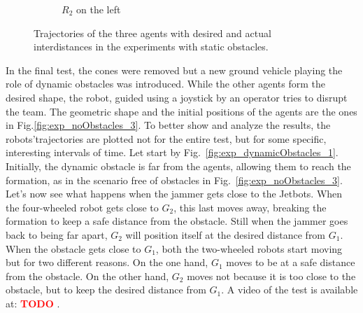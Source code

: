 \documentclass{ifacconf}
\newcommand{\TODO}[1]{
\textcolor{red}{\textbf{TODO} #1}
}
\begin{document}
\begin{figure}
\begin{subfigure}[b]{0.31\columnwidth}
        \caption{$R_2$ on the left}
        \label{fig:exp_staticObstacles_left}
    \end{subfigure}
    \vspace{-0.2cm}
    \caption{Trajectories of the three agents with desired and actual interdistances 
   in the experiments with static obstacles.}
    \label{fig:exp_staticObstacles}
\end{figure}

In the final test, the cones were removed but 
a new ground vehicle playing the role of dynamic obstacles was introduced.
While the other agents form the desired shape, the robot, guided using  
a joystick by an operator tries to disrupt the team.
The geometric shape and the initial positions of 
the agents are the ones in Fig.\ref{fig:exp_noObstacles_3}.
To better show and analyze the results, the robots'trajectories are plotted 
not for the entire test, but for some specific, interesting intervals of time.
Let start by Fig.~\ref{fig:exp_dynamicObstacles_1}.
Initially, the dynamic obstacle is far from the agents,
allowing them to reach 
the formation, as in the scenario free of obstacles 
in Fig.~\ref{fig:exp_noObstacles_3}.
Let's now see what happens when the jammer gets close to the Jetbots.
When the four-wheeled robot gets close to $G_2$, this last moves away, 
breaking the formation to keep a safe distance from the obstacle.
Still when the jammer goes back to being far apart, 
$G_2$ will position itself at the desired distance from $G_1$.
When the obstacle gets close to $G_1$, both the two-wheeled 
robots start moving but for two different reasons.
On the one hand, $G_1$ moves to be at a safe distance from the obstacle.
On the other hand, $G_2$ moves not because it is too close to the obstacle, 
but to keep the desired distance from $G_1$.
A video of the test is available at:\TODO{}.
\end{document}
